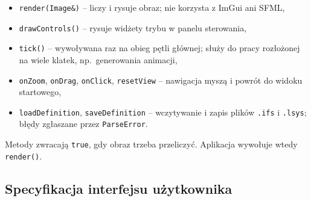 \documentclass[11pt,a4paper]{article}
\newcommand{\kod}[1]{\texttt{#1}}
\begin{document}
\begin{itemize}
  \item \kod{render(Image\&)} -- liczy i rysuje obraz; nie korzysta z ImGui
        ani SFML,
  \item \kod{drawControls()} -- rysuje widżety trybu w panelu sterowania,
  \item \kod{tick()} -- wywoływana raz na obieg pętli głównej; służy do pracy
        rozłożonej na wiele klatek, np.\ generowania animacji,
  \item \kod{onZoom}, \kod{onDrag}, \kod{onClick}, \kod{resetView} --
        nawigacja myszą i powrót do widoku startowego,
  \item \kod{loadDefinition}, \kod{saveDefinition} -- wczytywanie i zapis
        plików \kod{.ifs} i \kod{.lsys}; błędy zgłaszane przez
        \kod{ParseError}.
\end{itemize}

Metody zwracają \kod{true}, gdy obraz trzeba przeliczyć. Aplikacja wywołuje
wtedy \kod{render()}.

\subsection{Specyfikacja interfejsu użytkownika}
\end{document}
